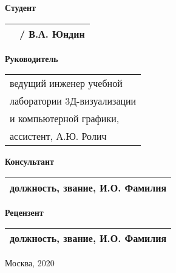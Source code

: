 \begin{multicols}{2}
    \noindent
    \textbf{Студент}
    
    \vspace{4mm}
    
    \noindent
    \begin{tabularx}{\linewidth}{Xc}
        & / В.А. Юндин \\
        \hline
    \end{tabularx}
    
    \columnbreak
    
    \noindent
    \textbf{Руководитель}
    
    \vspace{4mm}
    
    \noindent
    \begin{tabularx}{\linewidth}{l}
        ведущий инженер учебной \\ лаборатории 3Д-визуализации \\ и компьютерной графики, \\ ассистент, А.Ю. Ролич \\
        \hline
    \end{tabularx}

    \vspace{8mm}

    \noindent
    \textbf{Консультант}
    
    \vspace{4mm}
    
    \noindent
    \begin{tabularx}{\linewidth}{c}
        должность, звание, И.О. Фамилия \\
        \hline
    \end{tabularx}

    \vspace{8mm}
    
    \noindent
    \textbf{Рецензент}
    
    \vspace{4mm}
    
    \noindent
    \begin{tabularx}{\linewidth}{c}
        должность, звание, И.О. Фамилия \\
        \hline
    \end{tabularx}
\end{multicols}

\vfill
\begin{center}Москва, 2020\end{center}

\restoregeometry
\newpage
